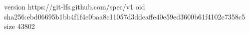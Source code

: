 version https://git-lfs.github.com/spec/v1
oid sha256:ebd06695b1bb4f1f4e0baa8c11057d3ddeaffe40e59ed3600b61f4102c7358c5
size 43802
